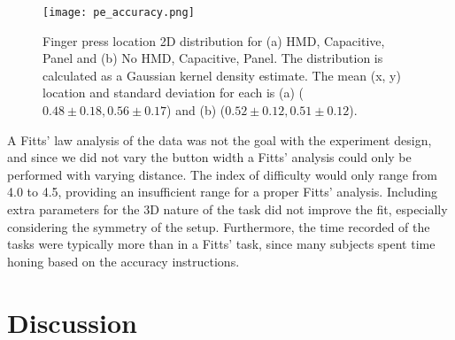 \begin{figure}
    \centering
    \texttt{[image: pe\_accuracy.png]}
    \caption{Finger press location 2D distribution for (a) HMD, Capacitive, Panel and (b) No HMD, Capacitive, Panel. The distribution is calculated as a Gaussian kernel density estimate. The mean (x, y) location and standard deviation for each is (a) ($0.48\pm0.18, 0.56\pm0.17$) and (b) ($0.52\pm0.12, 0.51\pm0.12$).}
    \label{fig:pe_accuracy}
\end{figure}

A Fitts’ law analysis of the data was not the goal with the experiment design, and since we did not vary the button width a Fitts’ analysis could only be performed with varying distance.
The index of difficulty would only range from 4.0 to 4.5, providing an insufficient range for a proper Fitts’ analysis.
Including extra parameters for the 3D nature of the task \citep{murata_extending_2001, cha_extended_2013} did not improve the fit, especially considering the symmetry of the setup.
Furthermore, the time recorded of the tasks were typically more than in a Fitts' task, since many subjects spent time honing based on the accuracy instructions.



\section{Discussion}

